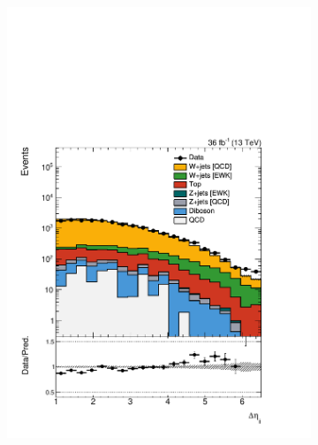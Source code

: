 \begin{figure}[]
    \begin{center}
        \begin{subfigure}[t]{0.24\textwidth}
            \includegraphics[width=\textwidth]{figures/vbf/prefit/singleelectron_jot12DEta_logy.pdf}
        \end{subfigure}
        \begin{subfigure}[t]{0.24\textwidth}

\end{subfigure}
\end{center}
\end{figure}
